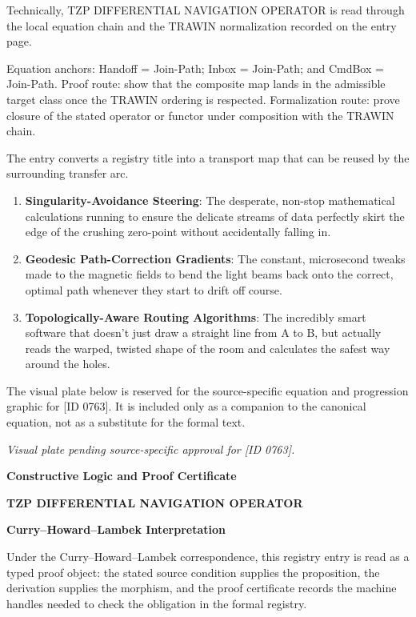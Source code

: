 Technically, TZP DIFFERENTIAL NAVIGATION OPERATOR is read through the local equation chain and the TRAWIN normalization recorded on the entry page.

Equation anchors: Handoff = Join-Path; Inbox = Join-Path; and CmdBox = Join-Path. Proof route: show that the composite map lands in the admissible target class once the TRAWIN ordering is respected. Formalization route: prove closure of the stated operator or functor under composition with the TRAWIN chain.

The entry converts a registry title into a transport map that can be reused by the surrounding transfer arc.
\endgroup

\begin{enumerate}[leftmargin=1.6em,itemsep=6pt,topsep=4pt]
\item \textbf{Singularity-Avoidance Steering}: The desperate, non-stop mathematical calculations running to ensure the delicate streams of data perfectly skirt the edge of the crushing zero-point without accidentally falling in.
\item \textbf{Geodesic Path-Correction Gradients}: The constant, microsecond tweaks made to the magnetic fields to bend the light beams back onto the correct, optimal path whenever they start to drift off course.
\item \textbf{Topologically-Aware Routing Algorithms}: The incredibly smart software that doesn't just draw a straight line from A to B, but actually reads the warped, twisted shape of the room and calculates the safest way around the holes.
\end{enumerate}

\begingroup\footnotesize\sloppy
The visual plate below is reserved for the source-specific equation and progression graphic for [ID 0763]. It is included only as a companion to the canonical equation, not as a substitute for the formal text.
\par\endgroup
\begingroup\footnotesize\itshape
Visual plate pending source-specific approval for [ID 0763].
\par\endgroup

\clearpage
\begingroup\tzpsupportsetup
\noindent\textbf{\fontsize{10.8pt}{12.8pt}\selectfont [ID 0763] Constructive Logic and Proof Certificate}\par
\noindent\textbf{\fontsize{10pt}{12pt}\selectfont TZP DIFFERENTIAL NAVIGATION OPERATOR}\par
\vspace{0.45em}
\begingroup
\footnotesize
\setlength{\parskip}{0.22em}
\setlength{\parindent}{0pt}
\noindent\textbf{Curry--Howard--Lambek Interpretation}\par
Under the Curry--Howard--Lambek correspondence, this registry entry is read as a typed proof
object: the stated source condition supplies the proposition, the derivation supplies the
morphism, and the proof certificate records the machine handles needed to check the obligation
in the formal registry.

